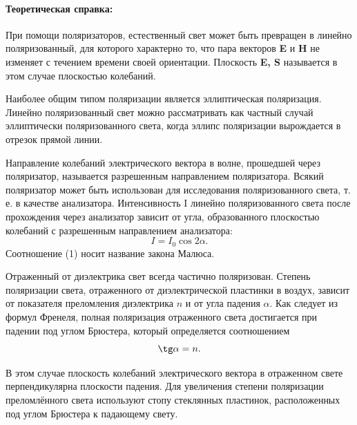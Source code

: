 \documentclass[a4paper,12pt]{article}
\begin{document}
\paragraph{Теоретическая справка:}
При помощи поляризаторов, естественный свет может быть превращен в линейно поляризованный, для которого характерно то, что пара векторов \textbf{E} и \textbf{H} не изменяет с течением времени своей ориентации. Плоскость \textbf{E, S} называется в этом случае плоскостью колебаний. \par
Наиболее общим типом поляризации является эллиптическая поляризация. Линейно поляризованный свет можно рассматривать как частный случай эллиптически поляризованного света, когда эллипс поляризации вырождается в отрезок прямой линии. \par
Направление колебаний электрического вектора в волне, прошедшей через поляризатор, называется
разрешенным направлением поляризатора.
Всякий поляризатор может быть использован для исследования поляризованного света, т. е. в качестве анализатора. Интенсивность I линейно поляризованного света после прохождения через анализатор зависит от угла, образованного плоскостью колебаний с разрешенным направлением анализатора:
\begin{equation}
  I = I_0 \cos 2\alpha.  
\end{equation}
Соотношение (1) носит название закона Малюса. \par
 Отраженный от диэлектрика свет всегда частично поляризован. Степень поляризации света, отраженного от диэлектрической пластинки в воздух, зависит от показателя преломления диэлектрика $n$ и от угла падения $\alpha$. Как следует из формул Френеля, полная поляризация отраженного света достигается
при падении под углом Брюстера, который определяется соотношением
\begin{equation}
 \tg \alpha = n.   
\end{equation}

В этом случае плоскость колебаний электрического вектора в отраженном свете перпендикулярна плоскости падения. Для увеличения степени поляризации преломлённого
света используют стопу стеклянных пластинок, расположенных под углом Брюстера к падающему свету. 
\end{document}
